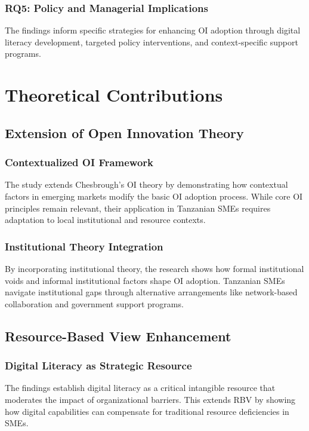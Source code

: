 \subsubsection{RQ5: Policy and Managerial Implications}
The findings inform specific strategies for enhancing OI adoption through digital literacy development, targeted policy interventions, and context-specific support programs.

\section{Theoretical Contributions}

\subsection{Extension of Open Innovation Theory}

\subsubsection{Contextualized OI Framework}
The study extends Chesbrough's OI theory by demonstrating how contextual factors in emerging markets modify the basic OI adoption process. While core OI principles remain relevant, their application in Tanzanian SMEs requires adaptation to local institutional and resource contexts.

\subsubsection{Institutional Theory Integration}
By incorporating institutional theory, the research shows how formal institutional voids and informal institutional factors shape OI adoption. Tanzanian SMEs navigate institutional gaps through alternative arrangements like network-based collaboration and government support programs.

\subsection{Resource-Based View Enhancement}

\subsubsection{Digital Literacy as Strategic Resource}
The findings establish digital literacy as a critical intangible resource that moderates the impact of organizational barriers. This extends RBV by showing how digital capabilities can compensate for traditional resource deficiencies in SMEs.

